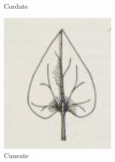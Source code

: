 \documentclass[12pt,english]{article}
\begin{document}
\begin{figure}[!hbt]
\begin{centre}
	\begin{minipage}{0.19\textwidth}
		\caption{Cordate}
		\includegraphics[width=\textwidth]{../code/contour/original/cordate}
	\end{minipage}
	\begin{minipage}{0.19\textwidth}
		\caption{Cuneate}

\end{minipage}
\end{centre}
\end{figure}
\end{document}
